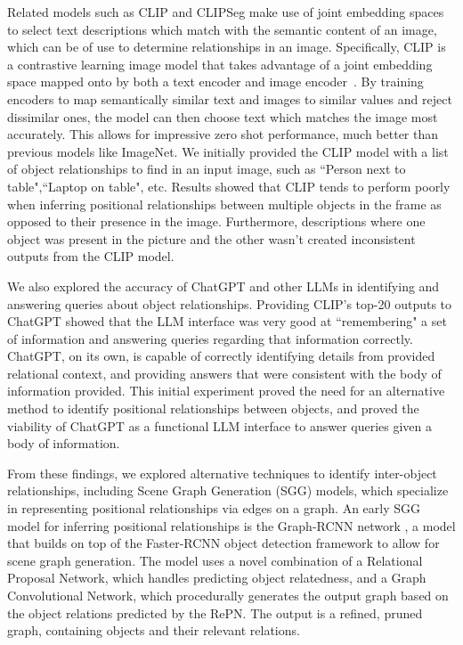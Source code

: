 \documentclass[letterpaper, 10 pt, conference]{ieeeconf}  %
\begin{document}
    Related models such as CLIP and CLIPSeg \cite{lueddecke22_cvpr} make use of joint embedding spaces to select text descriptions which match with the semantic content of an image, which can be of use to determine relationships in an image. Specifically, CLIP is a contrastive learning image model that takes advantage of a joint embedding space mapped onto by both a text encoder and image encoder~\cite{radford2021learning}. By training encoders to map semantically similar text and images to similar values and reject dissimilar ones, the model can then choose text which matches the image most accurately. This allows for impressive zero shot performance, much better than previous models like ImageNet. We initially provided the CLIP model with a list of object relationships to find in an input image, such as ``Person next to table",``Laptop on table", etc. Results showed that CLIP tends to perform poorly when inferring positional relationships between multiple objects in the frame as opposed to their presence in the image. Furthermore, descriptions where one object was present in the picture and the other wasn't created inconsistent outputs from the CLIP model.

    We also explored the accuracy of ChatGPT and other LLMs in identifying and answering queries about object relationships. Providing CLIP's top-20 outputs to ChatGPT showed that the LLM interface was very good at ``remembering" a set of information and answering queries regarding that information correctly. ChatGPT, on its own, is capable of correctly identifying details from provided relational context, and providing answers that were consistent with the body of information provided. This initial experiment proved the need for an alternative method to identify positional relationships between objects, and proved the viability of ChatGPT as a functional LLM interface to answer queries given a body of information.

    From these findings, we explored alternative techniques to identify inter-object relationships, including Scene Graph Generation (SGG) models, which specialize in representing positional relationships via edges on a graph. An early SGG model for inferring positional relationships is the Graph-RCNN network \cite{yang2018graph}, a model that builds on top of the Faster-RCNN object detection framework to allow for scene graph generation. The model uses a novel combination of a Relational Proposal Network, which handles predicting object relatedness, and a Graph Convolutional Network, which procedurally generates the output graph based on the object relations predicted by the RePN. The output is a refined, pruned graph, containing objects and their relevant relations. 
    
\end{document}
